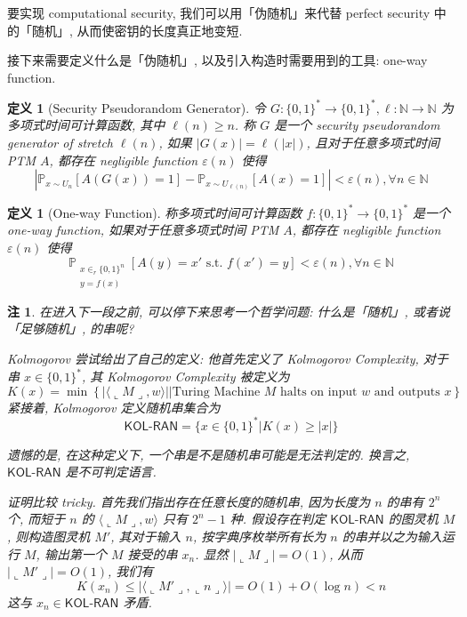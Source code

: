 \documentclass[8pt]{article}
\theoremstyle{compact}
\newtheorem{definition}[theorem]{定义}
\newtheorem{remark}[theorem]{注}
\def\le{\leqslant}
\def\ge{\geqslant}
\def\rep#1{\llcorner{#1}\lrcorner}
\begin{document}
要实现 computational security, 我们可以用「伪随机」来代替 perfect security 中的「随机」, 从而使密钥的长度真正地变短.

接下来需要定义什么是「伪随机」, 以及引入构造时需要用到的工具: one-way function.

\begin{definition}[Security Pseudorandom Generator]
	令 $G: \{0, 1\}^* \to \{0, 1\}^*, \ell: \mathbb N \to \mathbb N$ 为多项式时间可计算函数, 其中 $\ell(n) \ge n$. 称 $G$ 是一个 security pseudorandom generator of stretch $\ell(n)$, 如果 $|G(x)| = \ell(|x|)$, 且对于任意多项式时间 PTM $A$, 都存在 negligible function $\varepsilon(n)$ 使得 $$\left|\mathbb P_{x \sim U_n}[A(G(x)) = 1] - \mathbb P_{x \sim U_{\ell(n)}}[A(x) = 1]\right| < \varepsilon(n), \forall n \in \mathbb N$$
\end{definition}

\begin{definition}[One-way Function]
	称多项式时间可计算函数 $f: \{0, 1\}^* \to \{0, 1\}^*$ 是一个 one-way function, 如果对于任意多项式时间 PTM $A$, 都存在 negligible function $\varepsilon(n)$ 使得 $$\mathbb P_{\substack{x \in_r \{0, 1\}^n \\ y = f(x)}}[A(y) = x' \text{ s.t. } f(x') = y] < \varepsilon(n), \forall n \in \mathbb N$$
\end{definition}

\begin{remark}
	在进入下一段之前, 可以停下来思考一个哲学问题: 什么是「随机」, 或者说「足够随机」, 的串呢?

	Kolmogorov 尝试给出了自己的定义: 他首先定义了 Kolmogorov Complexity, 对于串 $x \in \{0, 1\}^*$, 其 Kolmogorov Complexity 被定义为 $$K(x) = \min \left\{|\langle \rep{M}, w\rangle | \bigg|\text{Turing Machine } M \text{ halts on input } w \text{ and outputs }x\right\}$$ 紧接着, Kolmogorov 定义随机串集合为 $$\textsf{KOL-RAN} = \{x \in \{0, 1\}^*| K(x) \ge |x|\}$$

	遗憾的是, 在这种定义下, 一个串是不是随机串可能是无法判定的. 换言之, $\textsf{KOL-RAN}$ 是不可判定语言.

	证明比较 tricky. 首先我们指出存在任意长度的随机串, 因为长度为 $n$ 的串有 $2^n$ 个, 而短于 $n$ 的 $\langle \rep{M}, w\rangle$ 只有 $2^n - 1$ 种. 假设存在判定 $\textsf{KOL-RAN}$ 的图灵机 $M$, 则构造图灵机 $M'$, 其对于输入 $n$, 按字典序枚举所有长为 $n$ 的串并以之为输入运行 $M$, 输出第一个 $M$ 接受的串 $x_n$. 显然 $|\rep{M}| = O(1)$, 从而 $|\rep{M'}| = O(1)$, 我们有 $$K(x_n) \le |\langle \rep{M'}, \rep{n}\rangle| = O(1) + O(\log n) < n$$ 这与 $x_n \in \textsf{KOL-RAN}$ 矛盾.
\end{remark}
\end{document}
